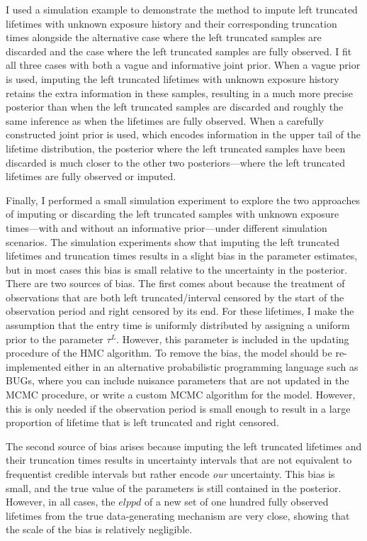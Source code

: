 I used a simulation example to demonstrate the method to impute left truncated lifetimes with unknown exposure history and their corresponding truncation times alongside the alternative case where the left truncated samples are discarded and the case where the left truncated samples are fully observed. I fit all three cases with both a vague and informative joint prior. When a vague prior is used, imputing the left truncated lifetimes with unknown exposure history retains the extra information in these samples, resulting in a much more precise posterior than when the left truncated samples are discarded and roughly the same inference as when the lifetimes are fully observed. When a carefully constructed joint prior is used, which encodes information in the upper tail of the lifetime distribution, the posterior where the left truncated samples have been discarded is much closer to the other two posteriors---where the left truncated lifetimes are fully observed or imputed.

Finally, I performed a small simulation experiment to explore the two approaches of imputing or discarding the left truncated samples with unknown exposure times---with and without an informative prior---under different simulation scenarios. The simulation experiments show that imputing the left truncated lifetimes and truncation times results in a slight bias in the parameter estimates, but in most cases this bias is small relative to the uncertainty in the posterior. There are two sources of bias. The first comes about because the treatment of observations that are both left truncated/interval censored by the start of the observation period and right censored by its end. For these lifetimes, I make the assumption that the entry time is uniformly distributed by assigning a uniform prior to the parameter $\tau^L$. However, this parameter is included in the updating procedure of the HMC algorithm. To remove the bias, the model should be re-implemented either in an alternative probabilistic programming language such as BUGs, where you can include nuisance parameters that are not updated in the MCMC procedure, or write a custom MCMC algorithm for the model. However, this is only needed if the observation period is small enough to result in a large proportion of lifetime that is left truncated and right censored.

The second source of bias arises because imputing the left truncated lifetimes and their truncation times results in uncertainty intervals that are not equivalent to frequentist credible intervals but rather encode \textit{our} uncertainty. This bias is small, and the true value of the parameters is still contained in the posterior. However, in all cases, the $elppd$ of a new set of one hundred fully observed lifetimes from the true data-generating mechanism are very close, showing that the scale of the bias is relatively negligible.

